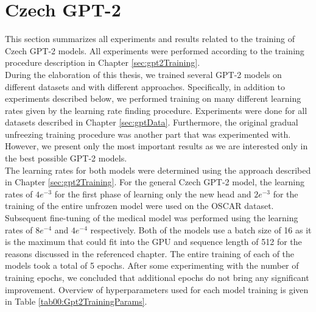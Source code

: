 \section{Czech GPT-2}
\label{sec:gpt2Experiments}
This section summarizes all experiments and results related to the training of Czech GPT-2 models. All experiments were performed according to the training procedure description in Chapter \ref{sec:gpt2Training}.\\

During the elaboration of this thesis, we trained several GPT-2 models on different datasets and with different approaches. Specifically, in addition to experiments described below, we performed training on many different learning rates given by the learning rate finding procedure. Experiments were done for all datasets described in Chapter \ref{sec:gptData}. Furthermore, the original gradual unfreezing training procedure was another part that was experimented with. However, we present only the most important results as we are interested only in the best possible GPT-2 models.\\

The learning rates for both models were determined using the approach described in Chapter \ref{sec:gpt2Training}. For the general Czech GPT-2 model, the learning rates of $4e^{-3}$ for the first phase of learning only the new head and $2e^{-3}$ for the training of the entire unfrozen model were used on the OSCAR dataset. Subsequent fine-tuning of the medical model was performed using the learning rates of $8e^{-4}$ and $4e^{-4}$ respectively. Both of the models use a batch size of 16 as it is the maximum that could fit into the GPU and sequence length of 512 for the reasons discussed in the referenced chapter. The entire training of each of the models took a total of 5 epochs. After some experimenting with the number of training epochs, we concluded that additional epochs do not bring any significant improvement. Overview of hyperparameters used for each model training is given in Table \ref{tab00:Gpt2TrainingParams}.

